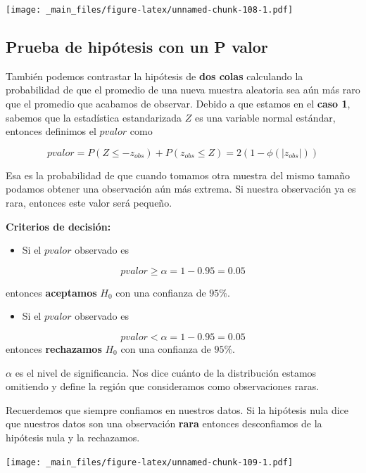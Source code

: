 \documentclass[
]{book}
\providecommand{\tightlist}{%
  \setlength{\itemsep}{0pt}\setlength{\parskip}{0pt}}
\begin{document}
\texttt{[image: \_main\_files/figure-latex/unnamed-chunk-108-1.pdf]}

\hypertarget{prueba-de-hipuxf3tesis-con-un-p-valor}{%
\subsection{Prueba de hipótesis con un P valor}\label{prueba-de-hipuxf3tesis-con-un-p-valor}}

También podemos contrastar la hipótesis de \textbf{dos colas} calculando la probabilidad de que el promedio de una nueva muestra aleatoria sea aún más raro que el promedio que acabamos de observar. Debido a que estamos en el \textbf{caso 1}, sabemos que la estadística estandarizada \(Z\) es una variable normal estándar, entonces definimos el \(pvalor\) como

\[pvalor = P(Z \leq -z_{obs}) + P(z_{obs} \leq Z) = 2 (1-\phi(|z_{obs}|))\]

Esa es la probabilidad de que cuando tomamos otra muestra del mismo tamaño podamos obtener una observación aún más extrema. Si nuestra observación ya es rara, entonces este valor será pequeño.

\textbf{Criterios de decisión:}

\begin{itemize}
\tightlist
\item
  Si el \(pvalor\) observado es
\end{itemize}

\[pvalor \geq \alpha =1-0.95=0.05\]

entonces \textbf{aceptamos} \(H_0\) con una confianza de \(95\%\).

\begin{itemize}
\tightlist
\item
  Si el \(pvalor\) observado es
\end{itemize}

\[pvalor < \alpha =1-0.95=0.05\]
entonces \textbf{rechazamos} \(H_0\) con una confianza de \(95\%\).

\(\alpha\) es el nivel de significancia. Nos dice cuánto de la distribución estamos omitiendo y define la región que consideramos como observaciones raras.

Recuerdemos que siempre confiamos en nuestros datos. Si la hipótesis nula dice que nuestros datos son una observación \textbf{rara} entonces desconfiamos de la hipótesis nula y la rechazamos.

\texttt{[image: \_main\_files/figure-latex/unnamed-chunk-109-1.pdf]}
\end{document}
